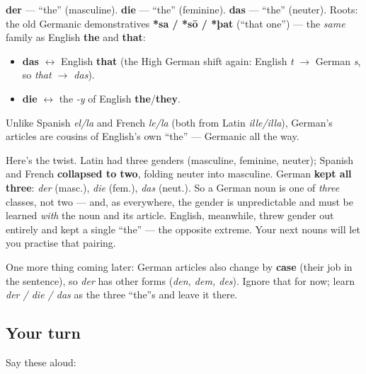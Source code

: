 \begin{cousinweb}
\textbf{der} — \textquotedblleft{}the\textquotedblright{} (masculine). \textbf{die} — \textquotedblleft{}the\textquotedblright{} (feminine). \textbf{das} — \textquotedblleft{}the\textquotedblright{} (neuter). Roots: the old Germanic demonstratives \textbf{*sa / *sō / *þat} (\textquotedblleft{}that one\textquotedblright{}) — the \emph{same} family as English \textbf{the} and \textbf{that}:

\begin{itemize}
\raggedright
  \item \textbf{das} $\leftrightarrow$ English \textbf{that} (the High German shift again: English \emph{t} $\to$ German \emph{s}, so \emph{that $\to$ das}).
  \item \textbf{die} $\leftrightarrow$ the \emph{-y} of English \textbf{the}/\textbf{they}.
\end{itemize}

Unlike Spanish \emph{el/la} and French \emph{le/la} (both from Latin \emph{ille/illa}), German's articles are cousins of English's own \textquotedblleft{}the\textquotedblright{} — Germanic all the way.
\end{cousinweb}

\begin{grammarlens}[title={Grammar Lens: German kept THREE genders}]
Here's the twist. Latin had three genders (masculine, feminine, neuter); Spanish and French \textbf{collapsed to two}, folding neuter into masculine. German \textbf{kept all three}: \emph{der} (masc.), \emph{die} (fem.), \emph{das} (neut.). So a German noun is one of \emph{three} classes, not two — and, as everywhere, the gender is unpredictable and must be learned \emph{with} the noun and its article. English, meanwhile, threw gender out entirely and kept a single \textquotedblleft{}the\textquotedblright{} — the opposite extreme. Your next nouns will let you practise that pairing.

One more thing coming later: German articles also change by \textbf{case} (their job in the sentence), so \emph{der} has other forms (\emph{den, dem, des}). Ignore that for now; learn \emph{der / die / das} as the three \textquotedblleft{}the\textquotedblright{}s and leave it there.
\end{grammarlens}

\subsection*{Your turn}
Say these aloud:

